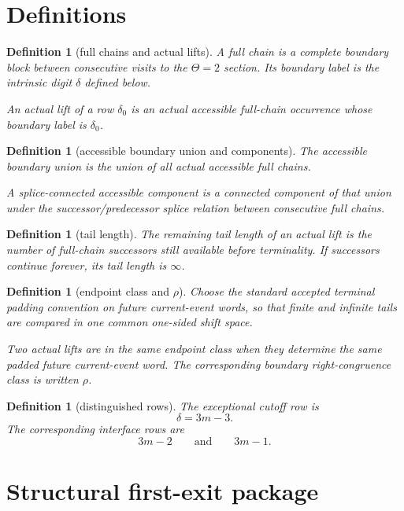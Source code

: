 \documentclass[11pt]{article}
\newtheorem{definition}[theorem]{Definition}
\begin{document}
\section{Definitions}

\begin{definition}[full chains and actual lifts]
A \emph{full chain} is a complete boundary block between consecutive visits to
the $\Theta=2$ section. Its boundary label is the intrinsic digit $\delta$
defined below.

An \emph{actual lift} of a row $\delta_0$ is an actual accessible full-chain
occurrence whose boundary label is $\delta_0$.
\end{definition}

\begin{definition}[accessible boundary union and components]
The \emph{accessible boundary union} is the union of all actual accessible full
chains.

A \emph{splice-connected accessible component} is a connected component of that
union under the successor/predecessor splice relation between consecutive full
chains.
\end{definition}

\begin{definition}[tail length]
The \emph{remaining tail length} of an actual lift is the number of full-chain
successors still available before terminality. If successors continue forever,
its tail length is $\infty$.
\end{definition}

\begin{definition}[endpoint class and $\rho$]
Choose the standard accepted terminal padding convention on future current-event
words, so that finite and infinite tails are compared in one common one-sided
shift space.

Two actual lifts are in the same \emph{endpoint class} when they determine the
same padded future current-event word. The corresponding boundary
right-congruence class is written $\rho$.
\end{definition}

\begin{definition}[distinguished rows]
The \emph{exceptional cutoff row} is
\[
\delta = 3m-3.
\]
The corresponding interface rows are
\[
3m-2 \qquad \text{and} \qquad 3m-1.
\]
\end{definition}

\section{Structural first-exit package}
\end{document}
